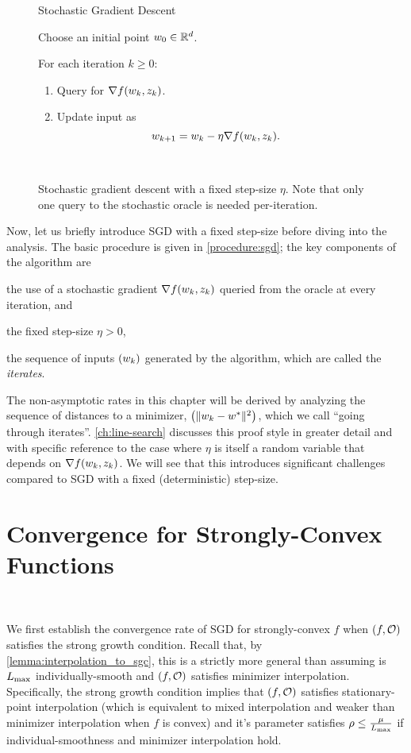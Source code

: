 \begin{figure}[t]
\begin{procedure}{Stochastic Gradient Descent}
\item Choose an initial point \( \w_0 \in \R^d \).
\item For each iteration \( k \geq 0 \):
    \begin{enumerate}
        \item Query \oracle{} for \( \grad(\wk, \zk) \).
        \item Update input as\vspace{-1ex}%
            \[ \wkk = \wk - \eta \grad(\wk, \zk). \]
    \end{enumerate}
\end{procedure}
\caption{Stochastic gradient descent with a fixed step-size \( \eta \). Note that only one query to the stochastic oracle is needed per-iteration.}~\label{procedure:sgd}
\end{figure}

Now, let us briefly introduce SGD with a fixed step-size before diving into the analysis.
The basic procedure is given in \autoref{procedure:sgd}; the key components of the algorithm are %
\begin{inparaenum}[i)] 
    \item the use of a stochastic gradient \( \grad(\wk, \zk) \) queried from the oracle at every iteration, and
    \item the fixed step-size \( \eta > 0 \),
    \item the sequence of inputs \( \seq{\wk} \) generated by the algorithm, which are called the \emph{iterates}. 
\end{inparaenum}
The non-asymptotic rates in this chapter will be derived by analyzing the sequence of distances to a minimizer, \( \seq{\norm{\wk - \wopt}^2} \), which we call ``going through iterates''. \autoref{ch:line-search} discusses this proof style in greater detail and with specific reference to the case where \( \eta \) is itself a random variable that depends on \( \grad(\wk, \zk) \). We will see that this introduces significant challenges compared to SGD with a fixed (deterministic) step-size.

\section{Convergence for Strongly-Convex Functions}~\label{sec:sgd-sc}

We first establish the convergence rate of SGD for strongly-convex \( f \) when \( \rbr{f, \oracle} \) satisfies the strong growth condition. 
Recall that, by \autoref{lemma:interpolation_to_sgc}, this is a strictly more general than assuming \oracle{} is \( \Lmax \) individually-smooth and \( \rbr{f, \oracle} \) satisfies minimizer interpolation. 
Specifically, the strong growth condition implies that \( \rbr{f, \oracle{}} \) satisfies stationary-point interpolation (which is equivalent to mixed interpolation and weaker than minimizer interpolation when \( f \) is convex) and it's parameter satisfies \( \rho \leq \frac{\mu}{\Lmax} \) if individual-smoothness and minimizer interpolation hold. 

